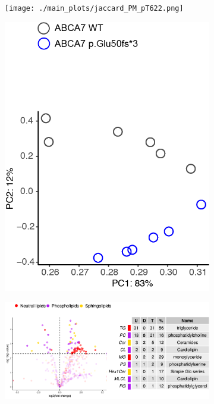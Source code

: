 \begin{figure}[ht]
    \begin{subfigure}[t]{.2\textwidth}
        \caption{}
        \texttt{[image: ./main\_plots/jaccard\_PM\_pT622.png]}        
    \end{subfigure} 
    \begin{subfigure}[t]{.2\textwidth}
        \caption{}
        \includegraphics[width=\textwidth]{./main_plots/g2_pca_lipids.png}        
    \end{subfigure} 
    \begin{subfigure}[t]{.3\textwidth}
        \caption{}
        \includegraphics[width=\textwidth]{./main_plots/iN_lipids_overview.png}        

\end{subfigure}
\end{figure}
